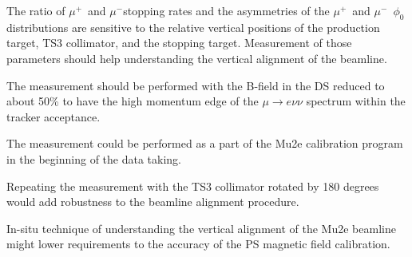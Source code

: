 \documentclass[12pt]{article}
\newcommand {\muminus}    {\mbox{$\mu^-$}}
\newcommand {\muplus}    {\mbox{$\mu^+$}}
\newcommand {\ra}        {\rightarrow}
\begin{document}
The ratio of \muplus\ and \muminus stopping rates and the asymmetries of the \muplus\ and 
\muminus\ $\phi_0$ distributions are sensitive to the relative vertical positions
of the production target, TS3 collimator, and the stopping target. Measurement of those
parameters should help understanding the vertical alignment of the beamline.

The measurement should be performed with the B-field in the DS reduced to about 50\%
to have the high momentum edge of the $\mu \ra e\nu\nu$ spectrum within the tracker acceptance.

The measurement could be performed as a part of the Mu2e calibration program in the beginning
of the data taking.

Repeating the measurement with the TS3 collimator rotated by 180 degrees would add robustness
to the beamline alignment procedure.

In-situ technique of understanding the vertical alignment of the Mu2e beamline might lower 
requirements to the accuracy of the PS magnetic field calibration.
\end{document}
